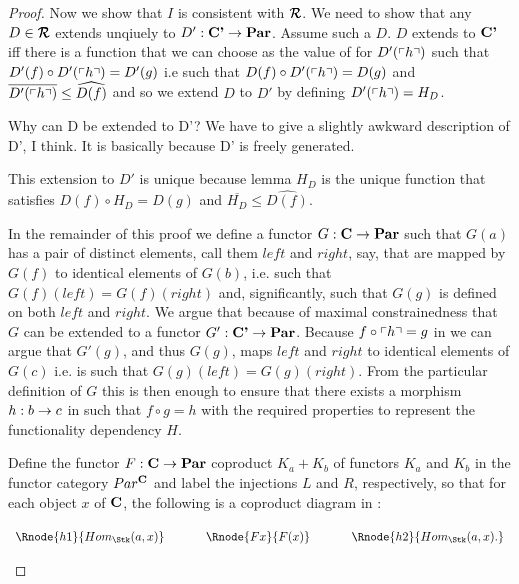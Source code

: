 \begin{proof}
Now we show that $I$ is consistent with $\reqtc$. 
We need to show that any $D \in \reqtc$
extends unqiuely to $D' :\textbf{C'} \rightarrow \textbf{Par}$. Assume such a $D$. 
$D$  extends to $\textbf{C'}$ iff there is a  function that we can choose as the value of  for $D'(\left\ulcorner h\right\urcorner)$  such that $D'(f) \circ D'(\left\ulcorner h\right\urcorner) = D'(g)$ i.e such that
$D(f) \circ D'(\left\ulcorner h\right\urcorner) = D(g)$ and $\overline{D'(\left\ulcorner h\right\urcorner)}\leq \widehat{D(f)}$
and so we  extend $D$ to $D'$ 
 by defining $D'(\left\ulcorner h\right\urcorner)=H_D$. 

\begin{worktt}Why can D be extended to D'?
We have to give a slightly awkward description of D', I think.
It is basically because D' is freely generated. 
\end{worktt} 
This extension to $D'$ is unique because 
lemma 
$H_D$ is the unique function 
that satisfies $D(f) \circ H_D = D(g)$ and $\overline{H_D}\leq \widehat{D(f)}$.

In the remainder of this proof 
we define a functor $G: \textbf{C} \rightarrow \textbf{Par}$ such that
$G(a)$ has a pair of distinct elements, call them $left$ and $right$, say,  that are mapped by $G(f)$ to identical elements
of $G(b)$, i.e. such that $G(f)(left)= G(f)(right)$ and, significantly,
such that $G(g)$ is defined on both $left$ and $right$.   
We  argue that because of  maximal constrainedness that $G$ can be extended to a functor 
$G' : \textbf{C'} \rightarrow \textbf{Par}$. 
Because $f \circ \left\ulcorner h\right\urcorner = g$ in \catcpw we can argue that $G'(g)$,
and thus $G(g)$,
maps $left$ and $right$ to identical elements of $G(c)$ 
i.e. is such that $G(g)(left)= G(g)(right)$. 
From the particular definition of $G$ this  is then enough 
to ensure that there exists a morphism $h:b \rightarrow c$ in \catcw
such that $f \circ g = h$
 with the required properties to represent the functionality dependency $H$.

Define the functor $F: \textbf{C} \rightarrow \textbf{Par}$ 
coproduct $K_a + K_b$ of functors $K_a$ and $K_b$ in the functor category $Par^{\textbf{C}}$ and label the injections $L$ and $R$, respectively,
so that for each object $x$ of $\textbf{C}$, the following is a coproduct diagram
in \Par:
\begin{center}
$
\begin{array}{c p{0.5cm} c p{0.5cm} c  }
\Rnode{h1}{Hom_{\Stk}(a,x)}  &&\Rnode{Fx}{F(x)}  &&   \Rnode{h2}{Hom_{\Stk}(a,x).}       
\end{array} 
$
\end{center} 


\end{proof}
